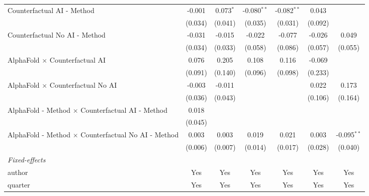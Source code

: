 \begin{tabular}{lcccccc}
   Counterfactual AI - Method                                 & -0.001  & 0.073$^{*}$ & -0.080$^{**}$ & -0.082$^{**}$ & 0.043   &   \\   
                                                              & (0.034) & (0.041)     & (0.035)       & (0.031)       & (0.092) &   \\   
   Counterfactual No AI - Method                              & -0.031  & -0.015      & -0.022        & -0.077        & -0.026  & 0.049\\   
                                                              & (0.034) & (0.033)     & (0.058)       & (0.086)       & (0.057) & (0.055)\\   
   AlphaFold $\times$ Counterfactual AI                       & 0.076   & 0.205       & 0.108         & 0.116         & -0.069  &   \\   
                                                              & (0.091) & (0.140)     & (0.096)       & (0.098)       & (0.233) &   \\   
   AlphaFold $\times$ Counterfactual No AI                    & -0.003  & -0.011      &               &               & 0.022   & 0.173\\   
                                                              & (0.036) & (0.043)     &               &               & (0.106) & (0.164)\\   
   AlphaFold - Method $\times$ Counterfactual AI - Method     & 0.018   &             &               &               &         &   \\   
                                                              & (0.045) &             &               &               &         &   \\   
   AlphaFold - Method $\times$ Counterfactual No AI - Method  & 0.003   & 0.003       & 0.019         & 0.021         & 0.003   & -0.095$^{**}$\\   
                                                              & (0.006) & (0.007)     & (0.014)       & (0.017)       & (0.028) & (0.040)\\   
   \midrule
   \emph{Fixed-effects}\\
   author                                                     & Yes     & Yes         & Yes           & Yes           & Yes     & Yes\\  
   quarter                                                    & Yes     & Yes         & Yes           & Yes           & Yes     & Yes\\  

\end{tabular}
